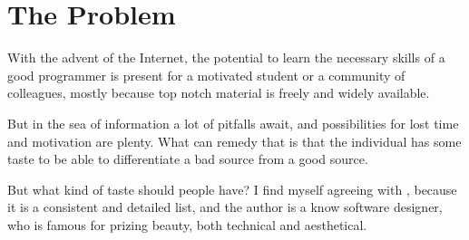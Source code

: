 \section{The Problem}

With the advent of the Internet,  the potential to learn the necessary skills of
a good programmer is present for a motivated student or a community of
colleagues, mostly because top notch material is freely and widely available. 

But in the sea of information a lot of pitfalls await, and possibilities for lost
time and motivation are plenty. What can remedy that is that the individual
has some taste to be able to differentiate a bad source from a good source. 

But what kind of taste should people have? I find myself agreeing with
\cite{education:paul_graham__a_taste_for_makers}, because it is a consistent
and detailed list, and the author is a know software designer, who is famous for
prizing beauty, both technical and aesthetical. 


